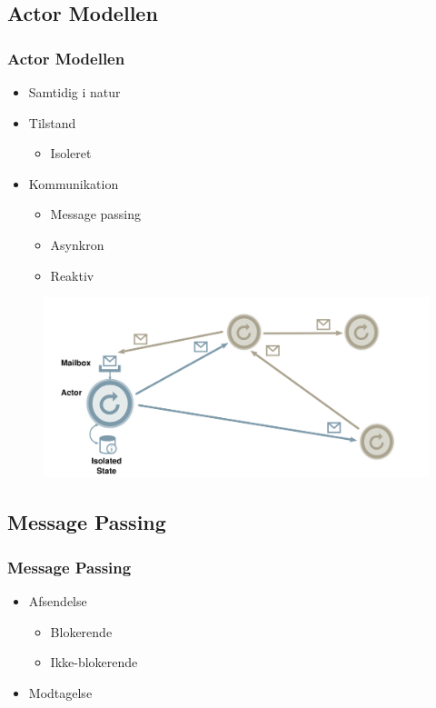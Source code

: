 \subsection{Actor Modellen}
\begin{frame}
  \frametitle{Actor Modellen}
  \begin{itemize}
    \item Samtidig i natur
    \item Tilstand
    \begin{itemize}
      \item Isoleret
    \end{itemize}
    \item Kommunikation
    \begin{itemize}
      \item Message passing
      \item Asynkron
      \item Reaktiv
    \end{itemize}
  \end{itemize}
  \begin{figure}[htbp]
  \centering
  \includegraphics[width=\textwidth]{Images/actors.pdf}
\end{figure}
\end{frame}

\subsection{Message Passing}
\begin{frame}
  \frametitle{Message Passing}
  \begin{itemize}
    \item Afsendelse
    \begin{itemize}
      \item Blokerende
      \item Ikke-blokerende
    \end{itemize}
    \item Modtagelse
  \end{itemize}
\end{frame}

